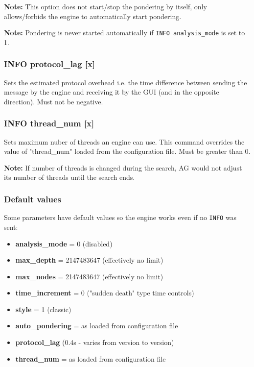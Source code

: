 \documentclass[12pt,a4paper]{article}
\begin{document}
\textbf{Note:} This option does not start/stop the pondering by itself, only allows/forbids the engine to automatically start pondering.

\textbf{Note:} Pondering is never started automatically if \texttt{INFO analysis{\_}mode} is set to 1.

\subsubsection{INFO protocol{\_}lag [x]}
Sets the estimated protocol overhead i.e. the time difference between sending the message by the engine and receiving it by the GUI (and in the opposite direction). Must not be negative.

\subsubsection{INFO thread{\_}num [x]}
Sets maximum nuber of threads an engine can use. This command overrides the value of "thread{\_}num" loaded from the configuration file. Must be greater than 0. 

\textbf{Note:} If number of threads is changed during the search, AG would not adjust its number of threads until the search ends.

\subsubsection{Default values}
Some parameters have default values so the engine works even if no \texttt{INFO} was sent:
\begin{itemize}
\item{\textbf{analysis{\_}mode} = 0 (disabled)}
\item{\textbf{max{\_}depth } = 2147483647 (effectively no limit)}
\item{\textbf{max{\_}nodes} = 2147483647 (effectively no limit)}
\item{\textbf{time{\_}increment} = 0 ("sudden death" \cite{suddendeath} type time controls)}
\item{\textbf{style} = 1 (classic)}
\item{\textbf{auto{\_}pondering} = as loaded from configuration file}
\item{\textbf{protocol{\_}lag}  (0.4s - varies from version to version)}
\item{\textbf{thread{\_}num} = as loaded from configuration file}
\end{itemize}
\end{document}

